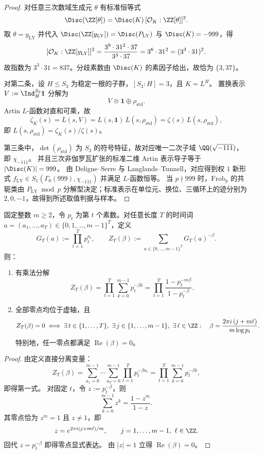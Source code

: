 \begin{proof}
对任意三次数域生成元 \(\theta\) 有标准恒等式
\[
\Disc(\ZZ[\theta])=\Disc(K)\,[\mathcal O_K:\ZZ[\theta]]^2.
\]
取 \(\theta=y_{\mathrm{LY}}\) 并代入
\(
\Disc(\ZZ[y_{\mathrm{LY}}])=\Disc(P_{\mathrm{LY}})
\)
与 \(\Disc(K)=-999\)，得
\[
[\mathcal O_K:\ZZ[y_{\mathrm{LY}}]]^2
=\frac{3^9\cdot 31^2\cdot 37}{3^3\cdot 37}
=3^6\cdot 31^2
=(3^3\cdot 31)^2.
\]
故指数为 \(3^3\cdot 31=837\)。分歧素数由 \(\Disc(K)\) 的素因子给出，故恰为 \(\{3,37\}\)。

对第二条，设 \(H\le S_3\) 为稳定一根的子群，\([S_3:H]=3\)，且 \(K=L^H\)。
置换表示 \(V:=\Ind_H^{S_3}\mathbf 1\) 分解为
\[
V\cong \mathbf 1\oplus \rho_{\mathrm{std}}.
\]
Artin \(L\)-函数对直和可乘，故
\[
\zeta_K(s)=L(s,V)=L(s,\mathbf 1)\,L(s,\rho_{\mathrm{std}})
=\zeta(s)\,L(s,\rho_{\mathrm{std}}),
\]
即
\(
L(s,\rho_{\mathrm{std}})=\zeta_K(s)/\zeta(s)
\)。

第三条中，\(\det(\rho_{\mathrm{std}})\) 为 \(S_3\) 的符号特征，故对应唯一二次子域 \(\QQ(\sqrt{-111})\)，即 \(\chi_{-111}\)。
并且三次非伽罗瓦扩张的标准二维 Artin 表示导子等于 \(|\Disc(K)|=999\)。
由 Deligne--Serre 与 Langlands--Tunnell，对应得到权 \(1\) 新形式
\(
f_{\mathrm{LY}}\in S_1(\Gamma_0(999),\chi_{-111})
\) 并满足 \(L\)-函数恒等。
当 \(p\nmid 999\) 时，\(\mathrm{Frob}_p\) 的共轭类由 \(P_{\mathrm{LY}}\bmod p\) 分解型决定；标准表示在单位元、换位、三循环上的迹分别为 \(2,0,-1\)，故得到所述取值判据与样本。
\end{proof}



\begin{theorem}\label{thm:xi-time-part9c-godel-leyang-circle}
固定整数 \(m\ge 2\)，令 \(p_t\) 为第 \(t\) 个素数。对任意长度 \(T\) 的时间词
\(
a=(a_1,\dots,a_T)\in\{0,1,\dots,m-1\}^T
\)，定义
\[
G_T(a):=\prod_{t=1}^{T}p_t^{a_t},
\qquad
Z_T(\beta):=\sum_{a\in\{0,\dots,m-1\}^T}G_T(a)^{-\beta}.
\]
则：
\begin{enumerate}
  \item 有乘法分解
  \[
  Z_T(\beta)=\prod_{t=1}^{T}\sum_{k=0}^{m-1}p_t^{-\beta k}
  =\prod_{t=1}^{T}\frac{1-p_t^{-m\beta}}{1-p_t^{-\beta}}.
  \]
  \item 全部零点均位于虚轴，且
  \[
  Z_T(\beta)=0
  \iff
  \exists\,t\in\{1,\dots,T\},\ \exists\,j\in\{1,\dots,m-1\},\ \exists\,\ell\in\ZZ:
  \quad
  \beta=\frac{2\pi i\,(j+m\ell)}{m\log p_t}.
  \]
  特别地，任一零点都满足 \(\operatorname{Re}(\beta)=0\)。
\end{enumerate}
\end{theorem}
\begin{proof}
由定义直接分离变量：
\[
Z_T(\beta)
=\sum_{a_1=0}^{m-1}\cdots\sum_{a_T=0}^{m-1}\prod_{t=1}^Tp_t^{-\beta a_t}
=\prod_{t=1}^{T}\sum_{k=0}^{m-1}p_t^{-\beta k},
\]
即得第一式。
对固定 \(t\)，令 \(z:=p_t^{-\beta}\)，则
\[
\sum_{k=0}^{m-1}z^k=\frac{1-z^m}{1-z}.
\]
其零点恰为 \(z^m=1\) 且 \(z\neq 1\)，即
\[
z=e^{2\pi i(j+m\ell)/m},
\qquad
j=1,\dots,m-1,\ \ell\in\ZZ.
\]
回代 \(z=p_t^{-\beta}\) 即得零点显式表达。
由 \(|z|=1\) 立得 \(\operatorname{Re}(\beta)=0\)。
\end{proof}

